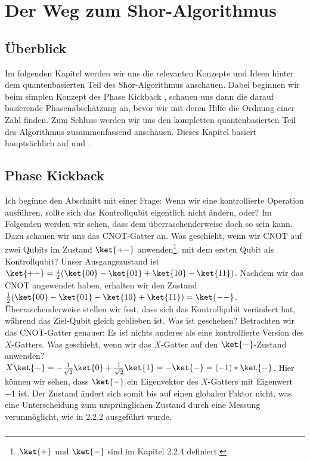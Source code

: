 \chapter{Der Weg zum Shor-Algorithmus}
\section{Überblick}
Im folgenden Kapitel werden wir uns die relevanten Konzepte und Ideen hinter dem quantenbasierten Teil des Shor-Algorithmus anschauen. Dabei beginnen wir beim simplen Konzept des \grqq Phase Kickback\grqq{} , schauen uns dann die darauf basierende Phasenabschätzung an, bevor wir mit deren Hilfe die Ordnung einer Zahl finden. Zum Schluss werden wir uns den kompletten quantenbasierten Teil des Algorithmus zusammenfassend anschauen. Dieses Kapitel basiert hauptsächlich auf \cite{QC} und \cite{QK}.

\section{Phase Kickback}
Ich beginne den Abschnitt mit einer Frage: Wenn wir eine kontrollierte Operation ausführen, sollte sich das Kontrollqubit eigentlich nicht ändern, oder? Im Folgenden werden wir sehen, dass dem überraschenderweise doch so sein kann. Dazu schauen wir uns das CNOT-Gatter an. Was geschieht, wenn wir CNOT auf zwei Qubits im Zustand $\ket{+-}$ anwenden\footnote{$\ket{+}$ und $\ket{-}$ sind im Kapitel 2.2.4 definiert.}, mit dem ersten Qubit als Kontrollqubit? Unser Ausgangszustand ist $\ket{+-} = \frac{1}{2}(\ket{00} - \ket{01} + \ket{10} - \ket{11})$. Nachdem wir das CNOT angewendet haben, erhalten wir den Zustand $\frac{1}{2}(\ket{00} - \ket{01} - \ket{10} + \ket{11}) = \ket{--}$. Überraschenderweise stellen wir fest, dass sich das Kontrollqubit verändert hat, während das Ziel-Qubit gleich geblieben ist. Was ist geschehen? Betrachten wir das CNOT-Gatter genauer: Es ist nichts anderes als eine kontrollierte Version des $X$-Gatters. Was geschieht, wenn wir das $X$-Gatter auf den $\ket{-}$-Zustand anwenden? $X\ket{-} = -\frac{1}{\sqrt{2}}\ket{0} + \frac{1}{\sqrt{2}}\ket{1} = -\ket{-} = (-1)*\ket{-}$. Hier können wir sehen, dass $\ket{-}$ ein Eigenvektor des $X$-Gatters mit Eigenwert $-1$ ist. Der Zustand ändert sich somit bis auf einen globalen Faktor nicht, was eine Unterscheidung zum ursprünglichen Zustand durch eine Messung verunmöglicht, wie in 2.2.2 ausgeführt wurde.

\paragraph{}

